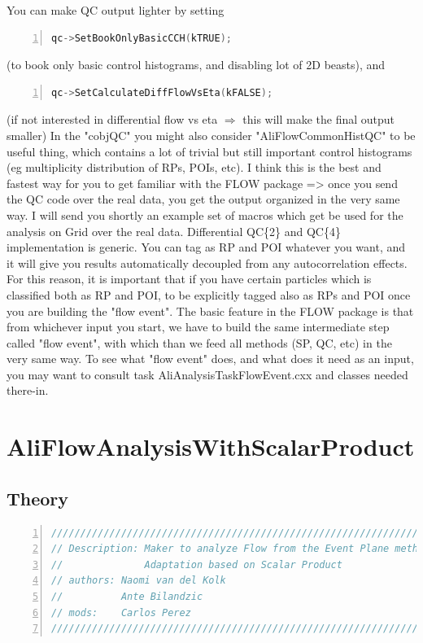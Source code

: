 \documentclass[a4paper]{book}
\numberwithin{equation}{subsection}
\begin{document}
 You can make QC output lighter by setting 
 	\begin{lstlisting}[language=C, numbers=left]
qc->SetBookOnlyBasicCCH(kTRUE);	\end{lstlisting} 
(to book only basic control histograms, and disabling lot of 2D beasts), and 
	\begin{lstlisting}[language=C, numbers=left]
qc->SetCalculateDiffFlowVsEta(kFALSE); 	\end{lstlisting}
(if not interested in differential flow vs eta $\Rightarrow$ this will make the final output smaller) 
 In the "cobjQC" you might also consider "AliFlowCommonHistQC" to be useful thing, which contains a lot of trivial but still important control histograms (eg multiplicity distribution of RPs, POIs, etc). 
 I think this is the best and fastest way for you to get familiar with the FLOW package => once you send the QC code over the real data, you get the output organized in the very same way. I will send you shortly an example set of macros which get be used for the analysis on Grid over the real data. 
 Differential QC\{2\} and QC\{4\} implementation is generic. You can tag as RP and POI whatever you want, and it will give you results automatically decoupled from any autocorrelation effects. For this reason, it is important that if you have certain particles which is classified both as RP and POI, to be explicitly tagged also as RPs and POI once you are building the "flow event". 
 The basic feature in the FLOW package is that from whichever input you start, we have to build the same intermediate step called "flow event", with which than we feed all methods (SP, QC, etc) in the very same way. 
 To see what "flow event" does, and what does it need as an input, you may want to consult task AliAnalysisTaskFlowEvent.cxx and classes needed there-in. 

\section{AliFlowAnalysisWithScalarProduct}
\label{sec:SP}\label{sec:scalar_product}
\subsection{Theory}
\begin{lstlisting}[language=C, numbers=left]
/////////////////////////////////////////////////////////////////////////////
// Description: Maker to analyze Flow from the Event Plane method.
//              Adaptation based on Scalar Product
// authors: Naomi van del Kolk
//          Ante Bilandzic
// mods:    Carlos Perez 
/////////////////////////////////////////////////////////////////////////////
\end{lstlisting}
\end{document}
